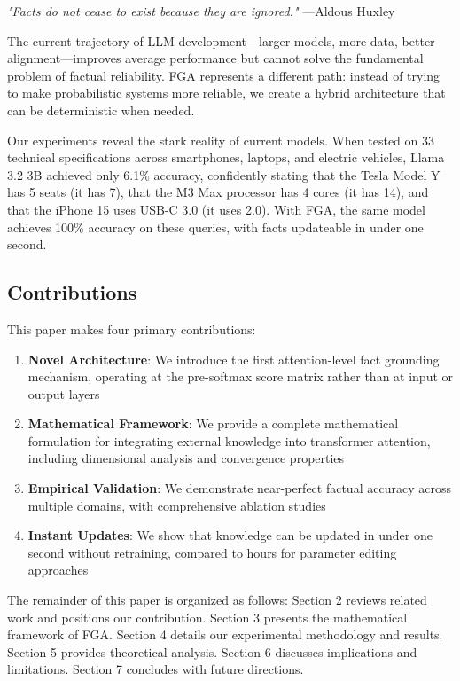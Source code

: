 \documentclass[11pt, a4paper]{article}
\theoremstyle{definition}
\begin{document}
\textit{"Facts do not cease to exist because they are ignored."} —Aldous Huxley

The current trajectory of LLM development—larger models, more data, better alignment—improves average performance but cannot solve the fundamental problem of factual reliability. FGA represents a different path: instead of trying to make probabilistic systems more reliable, we create a hybrid architecture that can be deterministic when needed.

Our experiments reveal the stark reality of current models. When tested on 33 technical specifications across smartphones, laptops, and electric vehicles, Llama 3.2 3B achieved only 6.1\% accuracy, confidently stating that the Tesla Model Y has 5 seats (it has 7), that the M3 Max processor has 4 cores (it has 14), and that the iPhone 15 uses USB-C 3.0 (it uses 2.0). With FGA, the same model achieves 100\% accuracy on these queries, with facts updateable in under one second.

\subsection{Contributions}

This paper makes four primary contributions:

\begin{enumerate}
    \item \textbf{Novel Architecture}: We introduce the first attention-level fact grounding mechanism, operating at the pre-softmax score matrix rather than at input or output layers
    
    \item \textbf{Mathematical Framework}: We provide a complete mathematical formulation for integrating external knowledge into transformer attention, including dimensional analysis and convergence properties
    
    \item \textbf{Empirical Validation}: We demonstrate near-perfect factual accuracy across multiple domains, with comprehensive ablation studies
    
    \item \textbf{Instant Updates}: We show that knowledge can be updated in under one second without retraining, compared to hours for parameter editing approaches
\end{enumerate}

The remainder of this paper is organized as follows: Section 2 reviews related work and positions our contribution. Section 3 presents the mathematical framework of FGA. Section 4 details our experimental methodology and results. Section 5 provides theoretical analysis. Section 6 discusses implications and limitations. Section 7 concludes with future directions.
\end{document}
